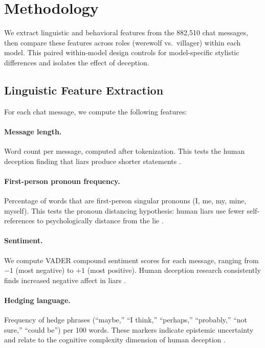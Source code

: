 \section{Methodology}
\label{sec:methodology}

We extract linguistic and behavioral features from the 882,510 chat messages, then compare these features across roles (werewolf vs.\ villager) within each model. This paired within-model design controls for model-specific stylistic differences and isolates the effect of deception.

\subsection{Linguistic Feature Extraction}

For each chat message, we compute the following features:

\paragraph{Message length.} Word count per message, computed after tokenization. This tests the human deception finding that liars produce shorter statements \citep{depaulo2003cues}.

\paragraph{First-person pronoun frequency.} Percentage of words that are first-person singular pronouns (I, me, my, mine, myself). This tests the pronoun distancing hypothesis: human liars use fewer self-references to psychologically distance from the lie \citep{newman2003lying}.

\paragraph{Sentiment.} We compute VADER \citep{hutto2014vader} compound sentiment scores for each message, ranging from $-1$ (most negative) to $+1$ (most positive). Human deception research consistently finds increased negative affect in liars \citep{depaulo2003cues}.

\paragraph{Hedging language.} Frequency of hedge phrases (``maybe,'' ``I think,'' ``perhaps,'' ``probably,'' ``not sure,'' ``could be'') per 100 words. These markers indicate epistemic uncertainty and relate to the cognitive complexity dimension of human deception \citep{newman2003lying}.

